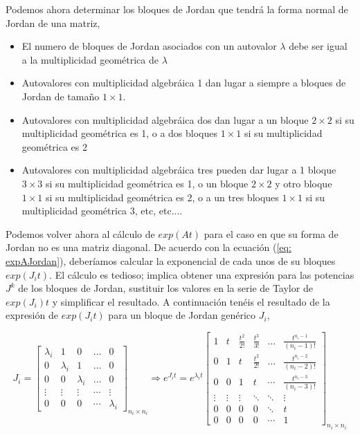 Podemos ahora determinar los bloques de Jordan que tendrá la forma normal de Jordan de una matriz,
\begin{itemize}
\item El numero de bloques de Jordan asociados con un autovalor $\lambda$ debe ser igual a la multiplicidad geométrica de $\lambda$
\item Autovalores con multiplicidad algebráica 1 dan lugar a siempre a bloques de Jordan de tamaño $1\times 1$.
\item Autovalores con multiplicidad algebráica dos dan lugar a un bloque $2\times 2$ si su multiplicidad geométrica es 1, o a dos bloques $1\times 1$ si su multiplicidad geométrica es 2
\item Autovalores con multiplicidad algebráica tres pueden dar lugar a 1 bloque $3\times 3$ si su multiplicidad geométrica es 1, o un bloque $2\times 2$ y otro bloque $1\times 1$ si su multiplicidad geométrica es 2, o a un tres bloques $1\times 1$ si su multiplicidad geométrica 3, etc, etc....
\end{itemize}

Podemos volver ahora al cálculo de $exp(At)$ para el caso en que su forma de Jordan no es una matriz diagonal. De acuerdo con la ecuación (\ref{eq: expAJordan}),  deberíamos calcular la exponencial de cada unos de su bloques $exp(J_it)$. El cálculo es tedioso; implica obtener una expresión para las potencias $J^k$ de los bloques de Jordan, sustituir los valores en la serie de Taylor de  $exp(J_i)t$ y simplificar el resultado. A continuación tenéis el resultado de la expresión de $exp(J_it)$ para un bloque de Jordan genérico $J_i$,

\begin{equation}
	J_i = \begin{bmatrix}
\lambda_i & 1 & 0 & \dots & 0 \\
		0 & \lambda_i & 1 & \dots & 0 \\
		0 & 0 & \lambda_i & \dots & 0 \\
		\vdots & \vdots & \vdots & \cdots & \vdots \\
		0 & 0 & 0 & \cdots & \lambda_i
	\end{bmatrix}_{n_i\times n_i} \Rightarrow  e^{J_it}= e^{\lambda_it}\begin{bmatrix}
         1 & t & \frac{t^2}{2!} &\frac{t^3}{3!}& \dots & \frac{t^{n_i-1}}{(n_i-1)!} \\
		0 & 1 & t &\frac{t^2}{2!}& \dots & \frac{t^{n_i-2}}{(n_i-2)!}\\
		0 & 0 & 1 & t &\cdots& \frac{t^{n_i-3}}{(n_i-3)!} \\
		\vdots & \vdots & \vdots & \ddots & \ddots &  \vdots \\
		0 & 0 & 0 & 0&\ddots & t \\
		0 & 0 & 0 & 0&\cdots & 1
	\end{bmatrix}_{n_i\times n_i}
\end{equation}

